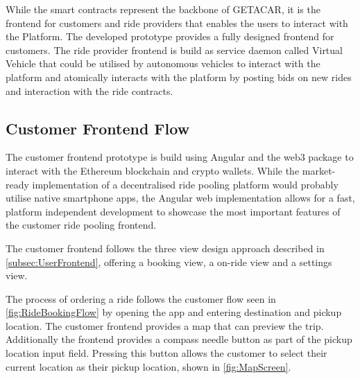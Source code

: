While the smart contracts represent the backbone of GETACAR, it is the frontend for customers and ride providers that enables the users to interact with the Platform. The developed prototype provides a fully designed frontend  for customers. The ride provider frontend is build as service daemon called Virtual Vehicle that could be utilised by autonomous vehicles to interact with the platform and atomically interacts with the platform by posting bids on new rides and interaction with the ride contracts. 

\subsection{Customer Frontend Flow}
The customer frontend prototype is build using Angular and the web3 package to interact with the Ethereum blockchain and crypto wallets. While the market-ready implementation of a decentralised ride pooling platform would probably utilise native smartphone apps, the Angular web implementation allows for a fast, platform independent development to showcase the most important features of the customer ride pooling frontend. 

The customer frontend follows the three view design approach described in \ref{subsec:UserFrontend}, offering a booking view, a on-ride view and a settings view. 

The process of ordering a ride follows the customer flow seen in \ref{fig:RideBookingFlow} by opening the app and entering destination and pickup location. The customer frontend provides a map that can preview the trip. Additionally the frontend provides  a compass needle button as part of the pickup location input field. Pressing this button allows the customer to select their current location as their pickup location, shown in \ref{fig:MapScreen}.

